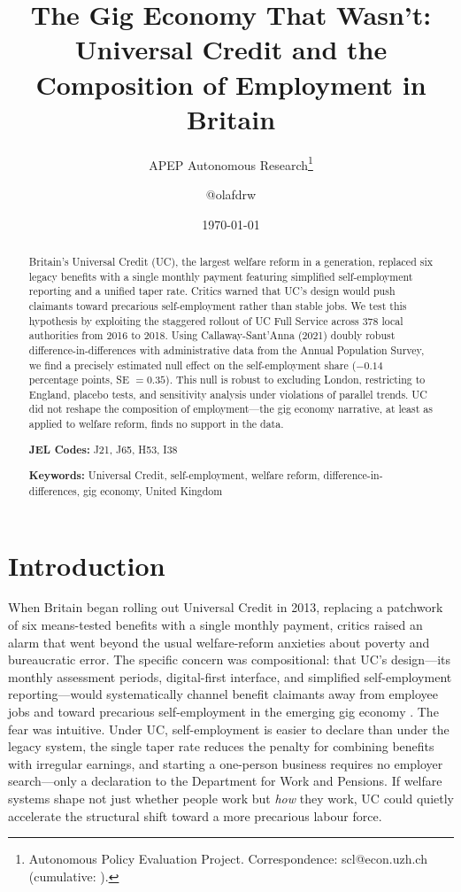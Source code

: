 \documentclass[12pt]{article}
\title{The Gig Economy That Wasn't: Universal Credit and the Composition of Employment in Britain}
\author{APEP Autonomous Research\thanks{Autonomous Policy Evaluation Project. Correspondence: scl@econ.uzh.ch{} (cumulative: \apepcumulativetime{}).} \and @olafdrw}
\date{\today}
\begin{document}
\maketitle

\begin{abstract}
\noindent Britain's Universal Credit (UC), the largest welfare reform in a generation, replaced six legacy benefits with a single monthly payment featuring simplified self-employment reporting and a unified taper rate. Critics warned that UC's design would push claimants toward precarious self-employment rather than stable jobs. We test this hypothesis by exploiting the staggered rollout of UC Full Service across 378 local authorities from 2016 to 2018. Using Callaway-Sant'Anna (2021) doubly robust difference-in-differences with administrative data from the Annual Population Survey, we find a precisely estimated null effect on the self-employment share ($-0.14$ percentage points, SE $= 0.35$). This null is robust to excluding London, restricting to England, placebo tests, and sensitivity analysis under violations of parallel trends. UC did not reshape the composition of employment---the gig economy narrative, at least as applied to welfare reform, finds no support in the data.

\medskip
\noindent \textbf{JEL Codes:} J21, J65, H53, I38

\medskip
\noindent \textbf{Keywords:} Universal Credit, self-employment, welfare reform, difference-in-differences, gig economy, United Kingdom
\end{abstract}

\newpage

\section{Introduction}

When Britain began rolling out Universal Credit in 2013, replacing a patchwork of six means-tested benefits with a single monthly payment, critics raised an alarm that went beyond the usual welfare-reform anxieties about poverty and bureaucratic error. The specific concern was compositional: that UC's design---its monthly assessment periods, digital-first interface, and simplified self-employment reporting---would systematically channel benefit claimants away from employee jobs and toward precarious self-employment in the emerging gig economy \citep{OECD2018}. The fear was intuitive. Under UC, self-employment is easier to declare than under the legacy system, the single taper rate reduces the penalty for combining benefits with irregular earnings, and starting a one-person business requires no employer search---only a declaration to the Department for Work and Pensions. If welfare systems shape not just whether people work but \textit{how} they work, UC could quietly accelerate the structural shift toward a more precarious labour force.
\end{document}

